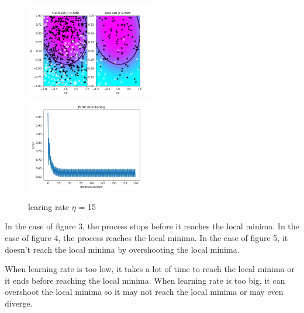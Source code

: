 \documentclass[a4paper]{article}
\begin{document}
\begin{figure}[h]
	\includegraphics[width=0.5\textwidth]{logreg_deg2_iter200_eta15.png}
	\includegraphics[width=0.5\textwidth]{logreg_deg2_iter200_eta15_error.png}
	\caption{learing rate $\eta$ = 15}
\end{figure}

In the case of figure 3, the process stops before it reaches the local minima. In the case of figure 4, the process reaches the local minima. In the case of figure 5, it doesn't reach the local minima by overshooting the local minima.

When learning rate is too low, it takes a lot of time to reach the local minima or it ends before reaching the local minima. When learning rate is too big, it can overshoot the local minima so it may not reach the local minima or may even diverge.
\end{document}
